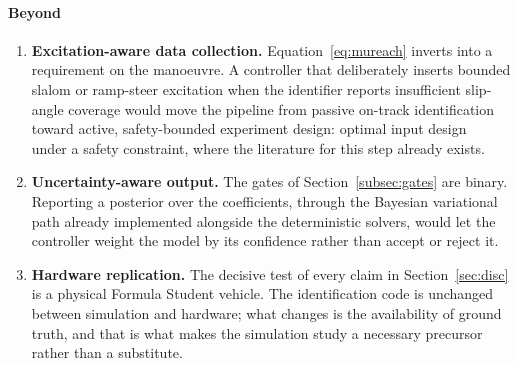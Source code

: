 \paragraph{Beyond}
\begin{enumerate}
\item \textbf{Excitation-aware data collection.} Equation~\eqref{eq:mureach}
inverts into a requirement on the manoeuvre. A controller that deliberately
inserts bounded slalom or ramp-steer excitation when the identifier reports
insufficient slip-angle coverage would move the pipeline from passive on-track
identification toward active, safety-bounded experiment design: optimal input
design~\cite{goodwin1977design} under a safety constraint, where the literature
for this step already exists.
\item \textbf{Uncertainty-aware output.} The gates of
Section~\ref{subsec:gates} are binary. Reporting a posterior over the
coefficients, through the Bayesian variational path already implemented
alongside the deterministic solvers, would let the controller weight the model
by its confidence rather than accept or reject it.
\item \textbf{Hardware replication.} The decisive test of every claim in
Section~\ref{sec:disc} is a physical Formula Student vehicle. The
identification code is unchanged between simulation and hardware; what changes
is the availability of ground truth, and that is what makes the simulation
study a necessary precursor rather than a substitute.
\end{enumerate}
